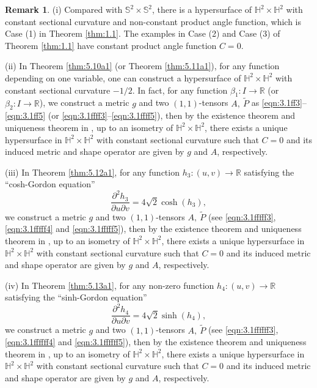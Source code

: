 \documentclass[reqno]{amsart}%
\theoremstyle{definition}
\newtheorem{remark}{Remark}[section]
\numberwithin{equation}{section}
\begin{document}
\begin{remark}\label{rem:1.1}
(i) Compared with $\mathbb{S}^2\times \mathbb{S}^2$, there is a hypersurface of $\mathbb{H}^2\times \mathbb{H}^2$ with constant sectional curvature and non-constant product angle function,
which is Case (1) in Theorem \ref{thm:1.1}. The examples in 
Case (2) and Case (3) of Theorem \ref{thm:1.1} have constant product angle function $C=0$.

(ii) In Theorem \ref{thm:5.10a1} (or Theorem \ref{thm:5.11a1}), for any function depending on one variable,
one can construct a hypersurface of $\mathbb{H}^2\times \mathbb{H}^2$ with constant sectional curvature
$-1/2$. In fact, for any function $\beta_1:I\rightarrow \mathbb{R}$ (or $\beta_2:I\rightarrow \mathbb{R}$), we construct a metric $g$ and two $(1,1)$-tensors $A,~\tilde{P}$ as \eqref{eqn:3.1ff3}--\eqref{eqn:3.1ff5}
(or \eqref{eqn:3.1ffff3}--\eqref{eqn:3.1ffff5}), then by the existence theorem
and uniqueness theorem in \cite{K,L-T-V}, up to an isometry of $\mathbb{H}^2\times\mathbb{H}^2$, there exists a unique hypersurface in $\mathbb{H}^2\times\mathbb{H}^2$ with constant sectional curvature
such that $C=0$ and its induced metric and shape operator  are given by $g$ and $A$,
respectively.

(iii) In Theorem \ref{thm:5.12a1}, for any function $h_3:(u,v)\to\mathbb{R}$ satisfying
the ``cosh-Gordon equation''
%
\begin{equation*}%
\frac{\partial^2 h_3}{\partial u \partial v}
=4\sqrt{2}\cosh(h_3),
\end{equation*}
we construct a metric $g$ and two
$(1,1)$-tensors $A,~\tilde{P}$ (see \eqref{eqn:3.1fffff3}, \eqref{eqn:3.1fffff4} and \eqref{eqn:3.1fffff5}), then by the existence theorem
and uniqueness theorem in \cite{K,L-T-V}, up to an isometry of $\mathbb{H}^2\times\mathbb{H}^2$, there exists a unique hypersurface in $\mathbb{H}^2\times\mathbb{H}^2$ with constant sectional curvature
such that $C=0$ and its induced metric and shape operator  are given by $g$ and $A$,
respectively.

(iv) In Theorem \ref{thm:5.13a1}, for any non-zero function $h_4:(u,v)\to\mathbb{R}$ satisfying
the ``sinh-Gordon equation''
%
\begin{equation*}%
\frac{\partial^2 h_4}{\partial u \partial v}
=4\sqrt{2}\sinh(h_4),
\end{equation*}
we construct a metric $g$ and two
$(1,1)$-tensors $A,~\tilde{P}$ (see \eqref{eqn:3.1ffffff3}, \eqref{eqn:3.1ffffff4} and \eqref{eqn:3.1ffffff5}), then by the existence theorem
and uniqueness theorem in \cite{K,L-T-V}, up to an isometry of $\mathbb{H}^2\times\mathbb{H}^2$, there exists a unique hypersurface in $\mathbb{H}^2\times\mathbb{H}^2$ with constant sectional curvature
such that $C=0$ and its induced metric and shape operator  are given by $g$ and $A$,
respectively.


\end{remark}
\end{document}
